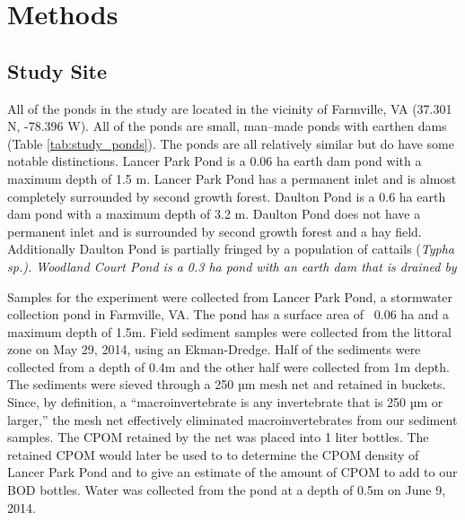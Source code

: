 \section{Methods}
\subsection{Study Site}
All of the ponds in the study are located in the vicinity of Farmville, VA (37.301 N, -78.396 W).  All of the ponds are small, man--made ponds with earthen dams (Table \ref{tab:study_ponds}).  The ponds are all relatively similar but do have some notable distinctions.  Lancer Park Pond is a 0.06 ha earth dam pond with a maximum depth of 1.5 m. Lancer Park Pond has a permanent inlet and is almost completely surrounded by second growth forest.  Daulton Pond is a 0.6 ha earth dam pond with a maximum depth of 3.2 m. Daulton Pond does not have a permanent inlet and is surrounded by second growth forest and a hay field. Additionally Daulton Pond is partially fringed by a population of cattails (\em{Typha sp.}). Woodland Court Pond is a 0.3 ha pond with an earth dam that is drained by 


Samples for the experiment were collected from Lancer Park Pond, a stormwater collection pond in Farmville, VA. The pond has a surface area of ~0.06 ha and a maximum depth of 1.5m. Field sediment samples were collected from the littoral zone on May 29, 2014, using an Ekman-Dredge. Half of the sediments were collected from a depth of 0.4m and the other half were collected from 1m depth. The sediments were sieved through a 250 µm mesh net and retained in buckets. Since, by definition, a “macroinvertebrate is any invertebrate that is 250 µm or larger,” the mesh net effectively eliminated macroinvertebrates from our sediment samples. The CPOM retained by the net was placed into 1 liter bottles. The retained CPOM would later be used to to determine the CPOM density of Lancer Park Pond and to give an estimate of the amount of CPOM to add to our BOD bottles. Water was collected from the pond at a depth of 0.5m on June 9, 2014.
    
